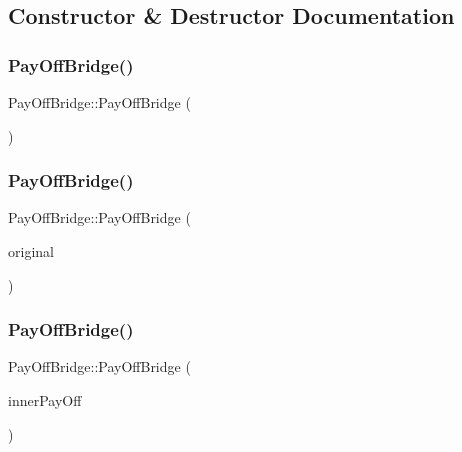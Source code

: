 \subsection{Constructor \& Destructor Documentation}
\hypertarget{classPayOffBridge_a77f6f247c82e50276f36050cec6411c0}{}\label{classPayOffBridge_a77f6f247c82e50276f36050cec6411c0} 
\subsubsection{\texorpdfstring{Pay\+Off\+Bridge()}{PayOffBridge()}\hspace{0.1cm}{\footnotesize\ttfamily [1/3]}}
{\footnotesize\ttfamily Pay\+Off\+Bridge\+::\+Pay\+Off\+Bridge (\begin{DoxyParamCaption}{ }\end{DoxyParamCaption})}

\hypertarget{classPayOffBridge_ad727d80f5c03d94b07c8b795ed71414b}{}\label{classPayOffBridge_ad727d80f5c03d94b07c8b795ed71414b} 
\subsubsection{\texorpdfstring{Pay\+Off\+Bridge()}{PayOffBridge()}\hspace{0.1cm}{\footnotesize\ttfamily [2/3]}}
{\footnotesize\ttfamily Pay\+Off\+Bridge\+::\+Pay\+Off\+Bridge (\begin{DoxyParamCaption}\item[{const \hyperlink{classPayOffBridge}{Pay\+Off\+Bridge} \&}]{original }\end{DoxyParamCaption})}

\hypertarget{classPayOffBridge_a6a8fcd595a1c2ac037084fa5b42f40d7}{}\label{classPayOffBridge_a6a8fcd595a1c2ac037084fa5b42f40d7} 
\subsubsection{\texorpdfstring{Pay\+Off\+Bridge()}{PayOffBridge()}\hspace{0.1cm}{\footnotesize\ttfamily [3/3]}}
{\footnotesize\ttfamily Pay\+Off\+Bridge\+::\+Pay\+Off\+Bridge (\begin{DoxyParamCaption}\item[{const \hyperlink{classPayOff}{Pay\+Off} \&}]{inner\+Pay\+Off }\end{DoxyParamCaption})}

